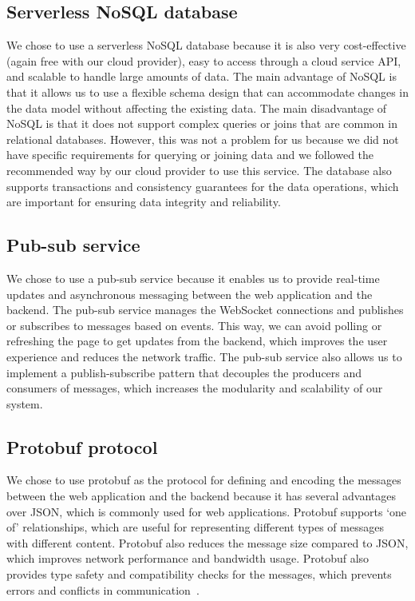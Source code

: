 \documentclass[
	english,
	ruledheaders=section,   %
	class=report,		    %
	thesis={type=bachelor}, %
	accentcolor=9c,			%
	custommargins=true,    %
	marginpar=false,        %
	parskip=half-,          %
	fontsize=11pt,          %
]{tudapub}
\begin{document}
\subsection{Serverless NoSQL database} 
We chose to use a serverless NoSQL database because it is also very cost-effective (again free with our cloud provider), easy to access through a cloud service API, and scalable to handle large amounts of data. The main advantage of NoSQL is that it allows us to use a flexible schema design that can accommodate changes in the data model without affecting the existing data. The main disadvantage of NoSQL is that it does not support complex queries or joins that are common in relational databases. However, this was not a problem for us because we did not have specific requirements for querying or joining data and we followed the recommended way by our cloud provider to use this service. The database also supports transactions and consistency guarantees for the data operations, which are important for ensuring data integrity and reliability.

\subsection{Pub-sub service}
We chose to use a pub-sub service because it enables us to provide real-time updates and asynchronous messaging between the web application and the backend. The pub-sub service manages the WebSocket connections and publishes or subscribes to messages based on events. This way, we can avoid polling or refreshing the page to get updates from the backend, which improves the user experience and reduces the network traffic. The pub-sub service also allows us to implement a publish-subscribe pattern that decouples the producers and consumers of messages, which increases the modularity and scalability of our system.

\subsection{Protobuf protocol}
We chose to use protobuf as the protocol for defining and encoding the messages between the web application and the backend because it has several advantages over JSON, which is commonly used for web applications. Protobuf supports ‘one of’ relationships, which are useful for representing different types of messages with different content. Protobuf also reduces the message size compared to JSON, which improves network performance and bandwidth usage. Protobuf also provides type safety and compatibility checks for the messages, which prevents errors and conflicts in communication~\cite{protobuf}.
\end{document}
